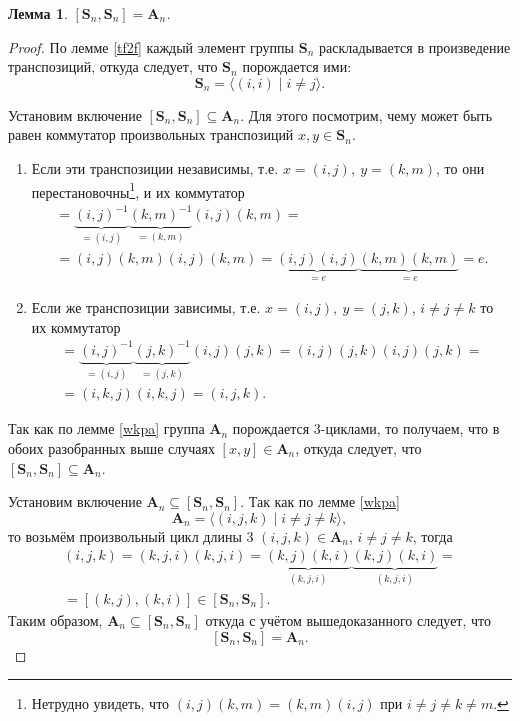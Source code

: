 \documentclass{article}
\newtheorem{lemma}{Лемма}[section]
\begin{document}
\begin{lemma} \label{fasdnJI}
    $[\mathbf{S}_n, \mathbf{S}_n] = \mathbf{A}_n$.
\end{lemma}
\begin{proof}
    По лемме \ref{tf2f} каждый элемент группы $\mathbf{S}_n$ раскладывается в произведение транспозиций, откуда следует, что $\mathbf{S}_n$ порождается ими: $$ \mathbf{S}_n = \langle (i, i) \mid i \neq j \rangle. $$

    Установим включение $[\mathbf{S}_n, \mathbf{S}_n] \subseteq \mathbf{A}_n$. Для этого посмотрим, чему может быть равен коммутатор произвольных транспозиций $x, y \in \mathbf{S}_n$.
    \begin{enumerate}
        \item Если эти транспозиции независимы, т.е. $x = (i, j), \ y = (k, m)$, то они перестановочны\footnote{Нетрудно увидеть, что $(i,j)(k,m) = (k,m)(i,j)$ при $i \neq j \neq k \neq m$.}, и их коммутатор
        \begin{gather*}
            [(i, j), (k, m)] = \underbrace{(i, j)^{-1}}_{=(i, j)} \underbrace{(k, m)^{-1}}_{=(k, m)} (i, j) (k, m) = \\
            = (i, j) (k, m) (i, j) (k, m) = \underbrace{(i, j) (i, j)}_{=e} \underbrace{(k,m) (k,m)}_{=e} = e.
        \end{gather*}

        \item Если же транспозиции зависимы, т.е. $x = (i, j), \ y = (j, k)$, $i \neq j \neq k$ то их коммутатор
        \begin{gather*}
            [(i, j), (j, k)] = \underbrace{(i, j)^{-1}}_{=(i, j)} \underbrace{(j, k)^{-1}}_{=(j, k)} (i, j) (j,k) = (i,j) (j, k) (i, j) (j, k) = \\
            = (i, k, j) (i, k, j) = (i, j, k).
        \end{gather*}
    \end{enumerate}
    Так как по лемме \ref{wkpa} группа $\mathbf{A}_n$ порождается 3-циклами, то получаем, что в обоих разобранных выше случаях $[x, y] \in \mathbf{A}_n$, откуда следует, что $[\mathbf{S}_n, \mathbf{S}_n] \subseteq \mathbf{A}_n$.

    Установим включение $\mathbf{A}_n \subseteq [\mathbf{S}_n, \mathbf{S}_n]$. Так как по лемме \ref{wkpa}
    \[
        \mathbf{A}_n = \langle (i, j, k) \mid i \neq j \neq k \rangle,
    \]
    то возьмём произвольный цикл длины 3 $(i, j, k) \in \mathbf{A}_n$, $i \neq j \neq k$, тогда
    \begin{gather*}
        (i, j, k) = (k, j, i) (k, j, i) = \underbrace{(k,j)(k, i)}_{(k, j, i)} \underbrace{(k,j)(k, i)}_{(k, j, i)} = \\
        = [(k, j), (k, i)] \in [\mathbf{S}_n, \mathbf{S}_n].
    \end{gather*}
    Таким образом, $\mathbf{A}_n \subseteq [\mathbf{S}_n, \mathbf{S}_n]$ откуда с учётом вышедоказанного следует, что $$ [\mathbf{S}_n, \mathbf{S}_n] = \mathbf{A}_n. $$
\end{proof}
\end{document}
